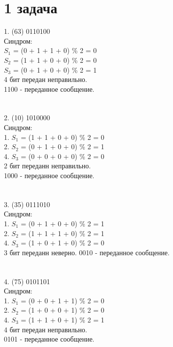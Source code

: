 \documentclass[12pt,onecolumn]{article}
\begin{document}
\section{1 задача}
1. (63)  0110100 \\
   Синдром:\\
   $S_1$ = (0 + 1 + 1 + 0) \% 2 = 0\\
   $S_2$ = (1 + 1 + 0 + 0) \% 2 = 0\\
   $S_3$ = (0 + 1 + 0 + 0) \% 2 = 1\\
   4 бит передан неправильно. \\
   1100 - переданное сообщение. \\ 
\\
\\
2. (10) 1010000 \\
   Синдром: \\
   1. $S_1$ = (1 + 1 + 0 + 0) \% 2 = 0\\
   2. $S_2$ = (0 + 1 + 0 + 0) \% 2 = 1\\
   4. $S_3$ = (0 + 0 + 0 + 0) \% 2 = 0\\
   2 бит переданн неправильно. \\
   1000 - переданное сообщение. \\
\\
\\
3. (35) 0111010 \\
   Синдром: \\
   1. $S_1$ = (0 + 1 + 0 + 0) \% 2 = 1\\
   2. $S_2$ = (1 + 1 + 1 + 0) \% 2 = 1\\ 
   4. $S_3$ = (1 + 0 + 1 + 0) \% 2 = 0\\ 
   3 бит переданн неверно.
   0010 - переданное сообщение. \\
\\
\\
4. (75) 0101101 \\
   Синдром: \\
   1. $S_1$ = (0 + 0 + 1 + 1) \% 2 = 0 \\
   2. $S_2$ = (1 + 0 + 0 + 1) \% 2 = 0\\
   4. $S_3$ = (1 + 1 + 0 + 1) \% 2 = 1\\
   4 бит передан неправильно. \\
   0101 - переданное сообщение. \\
\newpage
\end{document}
